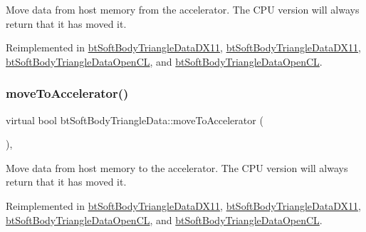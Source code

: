 Move data from host memory from the accelerator. The C\+PU version will always return that it has moved it. 

Reimplemented in \hyperlink{classbtSoftBodyTriangleDataDX11_aeef8543b31e4ee314e7fdf971197276c}{bt\+Soft\+Body\+Triangle\+Data\+D\+X11}, \hyperlink{classbtSoftBodyTriangleDataDX11_a8b0e445184f7afe24741912aa5d93e72}{bt\+Soft\+Body\+Triangle\+Data\+D\+X11}, \hyperlink{classbtSoftBodyTriangleDataOpenCL_ab03606a0597e8990959452d975ec7bf2}{bt\+Soft\+Body\+Triangle\+Data\+Open\+CL}, and \hyperlink{classbtSoftBodyTriangleDataOpenCL_a6ff4ef4ea2e8491908c7bf742d4a8833}{bt\+Soft\+Body\+Triangle\+Data\+Open\+CL}.

\mbox{\label{classbtSoftBodyTriangleData_a64a1971c6c64d80cc8cd488cb11208a6}} 
\subsubsection{\texorpdfstring{move\+To\+Accelerator()}{moveToAccelerator()}\hspace{0.1cm}{\footnotesize\ttfamily [1/2]}}
{\footnotesize\ttfamily virtual bool bt\+Soft\+Body\+Triangle\+Data\+::move\+To\+Accelerator (\begin{DoxyParamCaption}{ }\end{DoxyParamCaption})\hspace{0.3cm}{\ttfamily [inline]}, {\ttfamily [virtual]}}

Move data from host memory to the accelerator. The C\+PU version will always return that it has moved it. 

Reimplemented in \hyperlink{classbtSoftBodyTriangleDataDX11_aa3d2af489f6521cdd95c152f49fcedff}{bt\+Soft\+Body\+Triangle\+Data\+D\+X11}, \hyperlink{classbtSoftBodyTriangleDataDX11_a6885a4e276703f9dd643fab1d6035586}{bt\+Soft\+Body\+Triangle\+Data\+D\+X11}, \hyperlink{classbtSoftBodyTriangleDataOpenCL_af92cd6a17855e603e73595ad229986f5}{bt\+Soft\+Body\+Triangle\+Data\+Open\+CL}, and \hyperlink{classbtSoftBodyTriangleDataOpenCL_a7b9ed62bd458f1397041d6e6bdae44bb}{bt\+Soft\+Body\+Triangle\+Data\+Open\+CL}.

\mbox{\label{classbtSoftBodyTriangleData_a64a1971c6c64d80cc8cd488cb11208a6}} 
